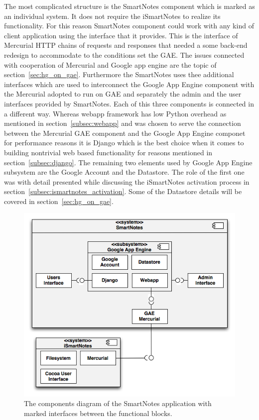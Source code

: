 The most complicated structure is the SmartNotes component which is marked as an individual system. It does not require the iSmartNotes to realize its functionality. For this reason SmartNotes component could work with any kind of client application using the interface that it provides. This is the interface of Mercurial HTTP chains of requests and responses that needed a some back-end redesign to accommodate to the conditions set the GAE. The issues  connected with cooperation of Mercurial and Google app engine are the topic of section~\ref{sec:hg_on_gae}. Furthermore the SmartNotes uses thee additional interfaces which are used to interconnect the Google App Engine component with the Mercurial adopted to run on GAE and separately the admin and the user interfaces provided by SmartNotes. Each of this three components is connected in a different way. Whereas  webapp framework has  low Python overhead as mentioned in section~\ref{subsec:webapp} and was chosen to serve the connection between the Mercurial GAE component and the Google App Engine componet for performance reasons it is Django which is the best choice when it comes to building nontrivial web based functionality for reasons mentioned in section~\ref{subsec:django}. The remaining two elements used by Google App Engine subsystem are the Google Account and the Datastore. The role of the first one was with detail presented while discussing the iSmartNotes activation process in section~\ref{subsec:ismartnotes_activation}. Some of the Datastore details will be covered in section~\ref{sec:hg_on_gae}. 
\begin{figure}[ht]
\begin{center}
\includegraphics[scale=0.6]{charts/smartnotes_componets.png}
\caption{The components diagram of  the SmartNotes application with marked interfaces between the functional blocks.}
\label{fig:smartnotes_components}
\end{center}
\end{figure}

